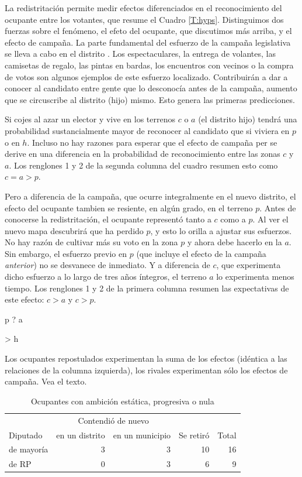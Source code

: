 \documentclass[letter,12pt]{article}
\newcommand{\mc}{\multicolumn}
\begin{document}
La redistritación permite medir efectos diferenciados en el reconocimiento del ocupante entre los votantes, que resume el Cuadro \ref{T:hyps}. Distinguimos dos fuerzas sobre el fenómeno, el efeto del ocupante, que discutimos más arriba, y el efecto de campaña. La parte fundamental del esfuerzo de la campaña legislativa se lleva a cabo en el distrito \citep{langston.nd}. Los espectaculares, la entrega de volantes, las camisetas de regalo, las pintas en bardas, los encuentros con vecinos o la compra de votos son algunos ejemplos de este esfuerzo localizado. Contribuirán a dar a conocer al candidato entre gente que lo desconocía antes de la campaña, aumento que se circuscribe al distrito (hijo) mismo. Esto genera las primeras predicciones.

Si cojes al azar un elector y vive en los terrenos $c$ o $a$ (el distrito hijo) tendrá una probabilidad sustancialmente mayor de reconocer al candidato que si viviera en $p$ o en $h$. Incluso no hay razones para esperar que el efecto de campaña per se derive en una diferencia en la probabilidad de reconocimiento entre las zonas $c$ y $a$. Los renglones 1 y 2 de la segunda columna del cuadro resumen esto como $c=a>p$. 

Pero a diferencia de la campaña, que ocurre integralmente en el nuevo distrito, el efecto del ocupante tambien se resiente, en algún grado, en el terreno $p$. Antes de conocerse la redistritación, el ocupante representó tanto a $c$ como a $p$. Al ver el nuevo mapa descubrirá que ha perdido $p$, y esto lo orilla a ajustar sus esfuerzos. No hay razón de cultivar más su voto en la zona $p$ y ahora debe hacerlo en la $a$. Sin embargo, el esfuerzo previo en $p$ (que incluye el efecto de la campaña \emph{anterior}) no se desvanece de inmediato. Y a diferencia de $c$, que experimenta dicho esfuerzo a lo largo de tres años íntegros, el terreno $a$ lo experimenta menos tiempo. Los renglones 1 y 2 de la primera columna resumen las expectativas de este efecto: $c>a$ y $c>p$. 

p ? a

> h

Los ocupantes repostulados experimentan la suma de los efectos (idéntica a las relaciones de la columna izquierda), los rivales experimentan sólo los efectos de campaña. Vea el texto.



\begin{table}
  \centering
  \begin{tabular}{lrrrr}
               & \mc{2}{c}{Contendió de nuevo}           &           &       \\ [-.5ex]
    Diputado   &        en un distrito & en un municipio & Se retiró & Total \\ \hline
    de mayoría &                     3 &            3    &        10 &    16 \\
    de RP      &                     0 &            3    &         6 &     9 \\ \hline
  \end{tabular}
  \caption{Ocupantes con ambición estática, progresiva o nula} \label{T:ambition}
\end{table}
\end{document}

